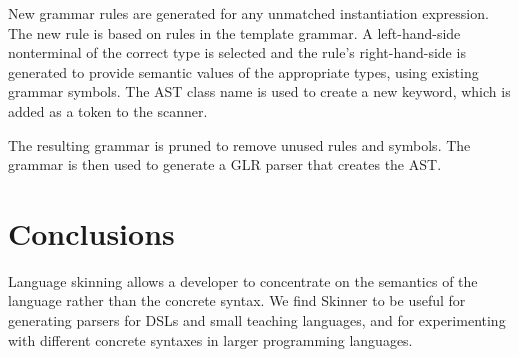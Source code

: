 \documentclass[nocopyrightspace,10pt]{sigplanconf}
\begin{document}
New grammar rules are generated for any unmatched instantiation expression.
The new rule is based
on rules in the template grammar.
A left-hand-side nonterminal of the correct type is selected and the rule's
right-hand-side is generated to provide semantic values of the appropriate
types, using existing grammar symbols. The AST class name is used to create a new keyword, which is added as
a token to the scanner.

The resulting grammar is pruned to remove unused rules and symbols.
The grammar is then used to generate a GLR parser that creates the AST.

\section{Conclusions}
\label{sec:conclusion}

Language skinning allows a developer to concentrate on the semantics of the
language rather than the concrete syntax. 
We find Skinner to be useful for generating parsers for DSLs and small teaching languages,
and for experimenting with different concrete syntaxes in larger
programming languages.

% 

\end{document}
